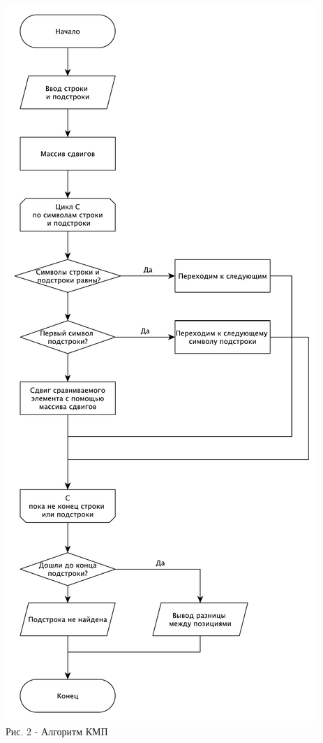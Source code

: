 \documentclass[a4paper,14pt]{article} %
\begin{document}
	\begin{center}
        		\includegraphics[scale = 0.57]{shema1} \\ Рис. 2 - Алгоритм КМП
	\end{center}
	
\end{document}
